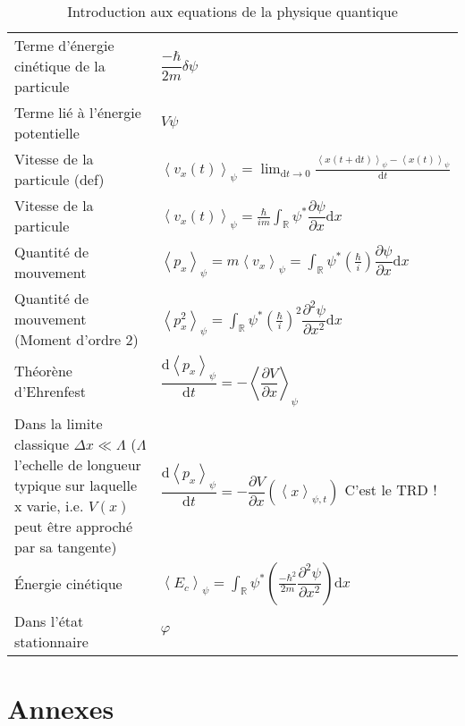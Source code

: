 \documentclass[10pt,a4paper,titlepage,portrait]{article}
\renewcommand{\d}
{
    \mathrm{d}
}
\newcommand*{\dv}[2]
{
    \dfrac{\d#1}{\d#2}
}
\newcommand*{\dpv}[2]
{
    \dfrac{\partial#1}{\partial#2}
}
\newcommand*{\ddpv}[2]
{
    \dfrac{\partial^2#1}{\partial{#2}^2}
}
\newcommand{\av}[2]
{
    \left\langle#1\right\rangle_{#2}
}
\newcommand{\lap}[1]
{
    \delta#1
}
\newcommand{\rint}
{
    \int_{\mathbb{R}}
}
\begin{document}
\begin{center}
\begin{table}[H]
\begin{tabular}{@{}p{9cm}p{10cm}@{}}
        Terme d'énergie cinétique de la particule & $\dfrac{-\hbar}{2m}\lap{\psi}$ \\
        Terme lié à l'énergie potentielle & $V\psi$ \\
        Vitesse de la particule (def) & $\av{v_x(t)}{\psi} = \displaystyle\lim_{\d t \to0} \frac{\av{x(t+\d t)}{\psi} - \av{x(t)}{\psi}}{\d t}$ \\
        Vitesse de la particule & $\displaystyle \av{v_x(t)}{\psi} = \frac{\hbar}{im}\rint \psi^* \dpv{\psi}{x}\d x$ \\
        Quantité de mouvement & $\displaystyle \av{p_x}{\psi}=m\av{v_x}{\psi}=\rint \psi^* \left(\frac{\hbar}{i}\right) \dpv{\psi}{x}\d x$ \\
        Quantité de mouvement (Moment d'ordre 2) & $\displaystyle \av{p_x^2}{\psi}=\rint \psi^* \left(\frac{\hbar}{i}\right)^2 \ddpv{\psi}{x}\d x$ \\
        Théorène d'Ehrenfest & $\dv{\av{p_x}{\psi}}{t} = -\av{\dpv{V}{x}}{\psi}$ \\
        Dans la limite classique $\Delta x \ll \Lambda $ ($\Lambda$ l'echelle de longueur typique sur laquelle x varie, i.e. $V(x)$ peut être approché par sa tangente) & $\dv{\av{p_x}{\psi}}{t} = -\dpv{V}{x} \left(\av{x}{\psi, t}\right)$ C'est le TRD ! \\
        Énergie cinétique & $\displaystyle \av{E_c}{\psi} = \rint \psi^* \left(\frac{-\hbar^2}{2m}\ddpv{\psi}{x}\right) \d x $\\
        Dans l'état stationnaire & $\varphi $ \\


        \bottomrule
\end{tabular}
\caption{Introduction aux equations de la physique quantique}
\label{tab:quantphis}
\end{table}

\section{Annexes}


\end{center}
\end{document}
